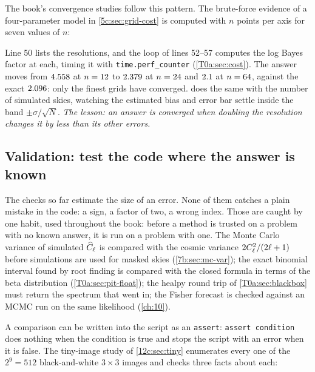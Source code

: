 The book's convergence studies follow this pattern. The brute-force evidence of a four-parameter model in \cref{5c:sec:grid-cost} is computed with $n$ points per axis for seven values of $n$:


Line 50 lists the resolutions, and the loop of lines 52--57 computes the log Bayes factor at each, timing it with \texttt{time.perf\_counter} (\cref{T0a:sec:cost}). The answer moves from $4.558$ at $n=12$ to $2.379$ at $n=24$ and $2.1$ at $n=64$, against the exact $2.096$: only the finest grids have converged.  does the same with the number of simulated skies, watching the estimated bias and error bar settle inside the band $\pm\sigma/\sqrt N$. \emph{The lesson: an answer is converged when doubling the resolution changes it by less than its other errors.}

\subsection{Validation: test the code where the answer is known}
\label{T0a:sec:trust-valid}

The checks so far estimate the size of an error. None of them catches a plain mistake in the code: a sign, a factor of two, a wrong index. Those are caught by one habit, used throughout the book: before a method is trusted on a problem with no known answer, it is run on a problem with one. The Monte Carlo variance of simulated $\widehat{C}_\ell$ is compared with the cosmic variance $2C_\ell^2/(2\ell+1)$ before simulations are used for masked skies (\cref{7b:sec:mc-var}); the exact binomial interval found by root finding is compared with the closed formula in terms of the beta distribution (\cref{T0a:sec:pit-float}); the healpy round trip of \cref{T0a:sec:blackbox} must return the spectrum that went in; the Fisher forecast is checked against an MCMC run on the same likelihood (\cref{ch:10}).

A comparison can be written into the script as an \texttt{assert}: \texttt{assert condition} does nothing when the condition is true and stops the script with an error when it is false. The tiny-image study of \cref{12c:sec:tiny} enumerates every one of the $2^9=512$ black-and-white $3\times3$ images and checks three facts about each:

